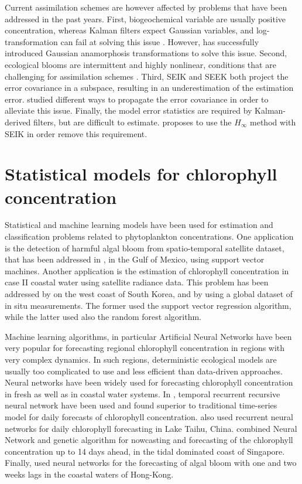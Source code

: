 Current assimilation schemes are however affected by problems that have been addressed in the past years. First, biogeochemical variable are usually positive concentration, whereas Kalman filters expect Gaussian variables, and log-transformation can fail at solving this issue \cite{Ciavatta2011}. However, \cite{Fontana2013} has successfully introduced Gaussian anamorphosis transformations to solve this issue. Second, ecological blooms are intermittent and highly nonlinear, conditions that are challenging for assimilation schemes \cite{Triantafyllou2012, Korres2012}. Third, SEIK and SEEK both project the error covariance in a subspace, resulting in an underestimation of the estimation error. \cite{Butenschon2012} studied different ways to propagate the error covariance in order to alleviate this issue. Finally, the model error statistics are required by Kalman-derived filters, but are difficult to estimate. \cite{Triantafyllou2012} proposes to use the $H_\infty$ method with SEIK in order remove this requirement.

\section{Statistical models for chlorophyll concentration}
\label{LR_stats}

Statistical and machine learning models have been used for estimation and classification problems related to phytoplankton concentrations. One application is the detection of harmful algal bloom from spatio-temporal satellite dataset, that has been addressed in \cite{Gokaraju2011}, in the Gulf of Mexico, using support vector machines. Another application is the estimation of chlorophyll concentration in case II coastal water using satellite radiance data. This problem has been addressed by \cite{Kim2014} on the west coast of South Korea, and by \cite{Camps-Valls2006} using a global dataset of in situ measurements. The former used the support vector regression algorithm, while the latter used also the random forest algorithm.

Machine learning algorithms, in particular Artificial Neural Networks have been very popular for forecasting regional chlorophyll concentration in regions with very complex dynamics. In such regions, deterministic ecological models are usually too complicated to use and less efficient than data-driven approaches. Neural networks have been widely used for forecasting chlorophyll concentration in fresh as well as in coastal water systems. In \cite{Jeong2006}, temporal recurrent recursive neural network have been used and found superior to traditional time-series model for daily forecasts of chlorophyll concentration. \cite{Wang2013} also used recurrent neural networks for daily chlorophyll forecasting in Lake Taihu, China. \cite{Mulia2013} combined Neural Network and genetic algorithm for nowcasting and forecasting of the chlorophyll concentration up to 14 days ahead, in the tidal dominated coast of Singapore. Finally, \cite{Lee2013} used neural networks for the forecasting of algal bloom with one and two weeks lags in the coastal waters of Hong-Kong.

